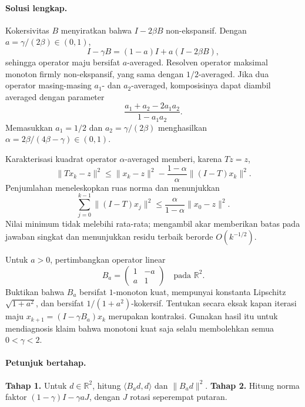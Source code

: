 \paragraph{Solusi lengkap.}
\label{orig03:ps05:solution:0002}
Kokersivitas $B$ menyiratkan bahwa $I-2\beta B$ non-ekspansif. Dengan
$a=\gamma/(2\beta)\in(0,1)$,
\[
 I-\gamma B=(1-a)I+a(I-2\beta B),
\]
sehingga operator maju bersifat $a$-averaged. Resolven operator maksimal
monoton firmly non-ekspansif, yang sama dengan $1/2$-averaged. Jika dua
operator masing-masing $a_1$- dan $a_2$-averaged, komposisinya dapat diambil
averaged dengan parameter
\[
 \frac{a_1+a_2-2a_1a_2}{1-a_1a_2}.
\]
Memasukkan $a_1=1/2$ dan $a_2=\gamma/(2\beta)$ menghasilkan
$\alpha=2\beta/(4\beta-\gamma)\in(0,1)$.

Karakterisasi kuadrat operator $\alpha$-averaged memberi, karena $Tz=z$,
\[
 \lVert Tx_k-z\rVert^2
 \le\lVert x_k-z\rVert^2
 -\frac{1-\alpha}{\alpha}\lVert(I-T)x_k\rVert^2.
\]
Penjumlahan meneleskopkan ruas norma dan menunjukkan
\[
 \sum_{j=0}^{k-1}\lVert(I-T)x_j\rVert^2
 \le\frac{\alpha}{1-\alpha}\lVert x_0-z\rVert^2.
\]
Nilai minimum tidak melebihi rata-rata; mengambil akar memberikan batas pada
jawaban singkat dan menunjukkan residu terbaik berorde $O(k^{-1/2})$.

\begin{exercise}
\label{orig03:ps05:exercise:0003}
Untuk $a>0$, pertimbangkan operator linear
\[
 B_a=\begin{pmatrix}1&-a\\a&1\end{pmatrix}
 \quad\text{pada }\mathbb R^2.
\]
Buktikan bahwa $B_a$ bersifat $1$-monoton kuat, mempunyai konstanta Lipschitz
$\sqrt{1+a^2}$, dan bersifat $1/(1+a^2)$-kokersif. Tentukan secara eksak
kapan iterasi maju $x_{k+1}=(I-\gamma B_a)x_k$ merupakan kontraksi. Gunakan
hasil itu untuk mendiagnosis klaim bahwa monotoni kuat saja selalu membolehkan
semua $0<\gamma<2$.
\end{exercise}

\paragraph{Petunjuk bertahap.}
\label{orig03:ps05:hint:0003}
\textbf{Tahap 1.} Untuk $d\in\mathbb R^2$, hitung
$\langle B_ad,d\rangle$ dan $\lVert B_ad\rVert^2$.
\textbf{Tahap 2.} Hitung norma faktor
$(1-\gamma)I-\gamma aJ$, dengan $J$ rotasi seperempat putaran.


